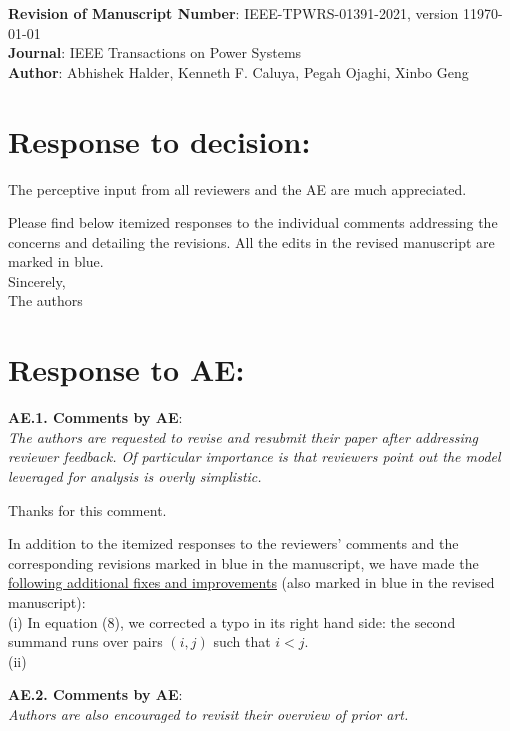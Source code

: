 \documentclass[12pt,onecolumn]{IEEEtran}
\newcommand{\blue}{\color{blue}}
\newcommand{\bp}{{\bm{p}}}
\def\spacingset#1{\def\baselinestretch{#1}\small\normalsize}
\newcommand{\nib}{\noindent  {\bf Response:} }
\begin{document}
\noindent
{\large {\bf Revision of
Manuscript Number}: IEEE-TPWRS-01391-2021, version 1\hfill \today\\[.1in]
{\bf Journal}: IEEE Transactions on Power Systems \\[.1in]
{\bf Author}: Abhishek Halder, Kenneth F. Caluya, Pegah Ojaghi, Xinbo Geng}\\



\section*{\large \bf Response to decision:}

{\noindent\blue
The perceptive input from all reviewers and the AE are much appreciated. 

Please find below itemized responses to the individual comments addressing the concerns and detailing the revisions. All the edits in the revised manuscript are marked in blue.\\

\noindent
Sincerely,\\
The authors
}



\spacingset{1}

\section*{\large \bf Response to AE:}

\noindent
{\bf AE.1. Comments by AE}:\\
{\em The authors are requested to revise and resubmit their paper after addressing reviewer feedback. Of particular importance is that reviewers point out the model leveraged for analysis is overly simplistic.}

{\nib {\blue Thanks for this comment.

In addition to the itemized responses to the reviewers' comments and the corresponding revisions marked in blue in the manuscript, we have made the \ul{following additional fixes and improvements} (also marked in blue in the revised manuscript):\\
(i) In equation (8), we corrected a typo in its right hand side: the second summand runs over pairs $(i,j)$ such that $i<j$.\\
(ii)  
}}


\noindent
{\bf AE.2. Comments by AE}:\\
{\em Authors are also encouraged to revisit their overview of prior art.}
\end{document}
